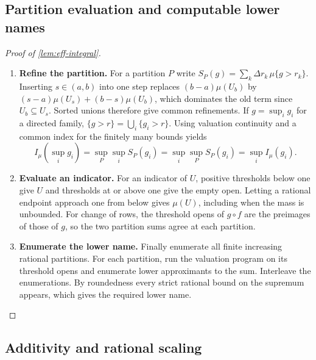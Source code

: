 \documentclass[11pt,a4paper]{article}
\theoremstyle{definition}
\theoremstyle{remark}\newaliascnt{remark}{theorem}
\numberwithin{equation}{section}
\begin{document}
\subsection{Partition evaluation and computable lower names}

\begin{proof}[Proof of \cref{lem:eff-integral}]\leavevmode
\begin{enumerate}[titledsteps]
    \item \textbf{Refine the partition.} For a partition \(P\) write \(S_P(g)=\sum_k\Delta r_k\,\mu\{g>r_k\}\). Inserting \(s\in(a,b)\) into one step replaces \((b-a)\mu(U_b)\) by \((s-a)\mu(U_s)+(b-s)\mu(U_b)\), which dominates the old term since \(U_b\subseteq U_s\). Sorted unions therefore give common refinements. If \(g=\sup_i g_i\) for a directed family, \(\{g>r\}=\bigcup_i\{g_i>r\}\). Using valuation continuity and a common index for the finitely many bounds yields
\[
 I_\mu(\sup_i g_i)=\sup_P\sup_i S_P(g_i)
                  =\sup_i\sup_P S_P(g_i)=\sup_i I_\mu(g_i).
\]


    \item \textbf{Evaluate an indicator.} For an indicator of $U$, positive thresholds below one give $U$ and thresholds at or above one give the empty open. Letting a rational endpoint approach one from below gives $\mu(U)$, including when the mass is unbounded. For change of rows, the threshold opens of $g\circ f$ are the preimages of those of $g$, so the two partition sums agree at each partition.


    \item \textbf{Enumerate the lower name.} Finally enumerate all finite increasing rational partitions. For each partition, run the valuation program on its threshold opens and enumerate lower approximants to the sum. Interleave the enumerations. By roundedness every strict rational bound on the supremum appears, which gives the required lower name.\qedhere

\end{enumerate}
\end{proof}

\subsection{Additivity and rational scaling}
\end{document}

